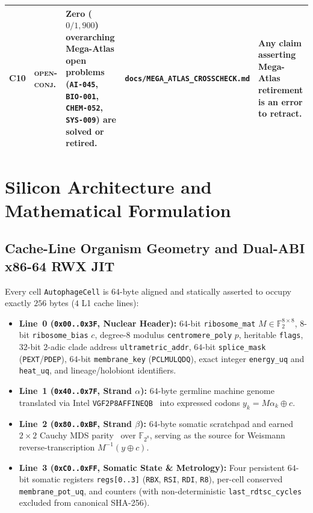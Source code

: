 \documentclass[11pt,reqno]{amsart}
\theoremstyle{plain}
\theoremstyle{definition}
\theoremstyle{remark}
\newcommand{\code}[1]{{\footnotesize\nolinkurl{#1}}}
\newcommand{\tcode}[1]{{\scriptsize\nolinkurl{#1}}}
\newcommand{\tagoc}{\textsc{open-conj.}}
\begin{document}
\begin{table}[t]
\begin{tabularx}{\textwidth}{@{}P{0.58cm}P{2.05cm}YP{2.80cm}P{2.40cm}@{}}
C10 & \tagoc & Zero ($0/1{,}900$) overarching Mega-Atlas open problems (\tcode{AI-045}, \tcode{BIO-001}, \tcode{CHEM-052}, \tcode{SYS-009}) are solved or retired. & \tcode{docs/MEGA_ATLAS_CROSSCHECK.md} & Any claim asserting Mega-Atlas retirement is an error to retract. \\
\bottomrule
\end{tabularx}
\end{table}

\section{Silicon Architecture and Mathematical Formulation}
\label{sec:arch}

\subsection{Cache-Line Organism Geometry and Dual-ABI x86-64 RWX JIT}
Every cell \code{AutophageCell} is $64$-byte aligned and statically asserted to occupy exactly $256$ bytes ($4$ L1 cache lines):
\begin{itemize}[leftmargin=1.5em,itemsep=2pt]
  \item \textbf{Line~0 (\code{0x00..0x3F}, Nuclear Header):} $64$-bit \code{ribosome_mat} $M \in \mathbb{F}_2^{8\times 8}$, $8$-bit \code{ribosome_bias} $c$, degree-$8$ modulus \code{centromere_poly} $p$, heritable \code{flags}, $32$-bit $2$-adic clade address \code{ultrametric_addr}, $64$-bit \code{splice_mask} (\code{PEXT}/\code{PDEP}), $64$-bit \code{membrane_key} (\code{PCLMULQDQ}), exact integer \code{energy_uq} and \code{heat_uq}, and lineage/holobiont identifiers.
  \item \textbf{Line~1 (\code{0x40..0x7F}, Strand $\alpha$):} $64$-byte germline machine genome translated via Intel \code{VGF2P8AFFINEQB}~\cite{intel2024sdm} into expressed codons $y_k = M \alpha_k \oplus c$.
  \item \textbf{Line~2 (\code{0x80..0xBF}, Strand $\beta$):} $64$-byte somatic scratchpad and earned $2 \times 2$ Cauchy MDS parity~\cite{blomer1995} over $\mathbb{F}_{2^8}$, serving as the source for Weismann reverse-transcription $M^{-1}(y \oplus c)$.
  \item \textbf{Line~3 (\code{0xC0..0xFF}, Somatic State \& Metrology):} Four persistent $64$-bit somatic registers \code{regs[0..3]} (\code{RBX}, \code{RSI}, \code{RDI}, \code{R8}), per-cell conserved \code{membrane_pot_uq}, and counters (with non-deterministic \code{last_rdtsc_cycles} excluded from canonical SHA-256).
\end{itemize}
\end{document}
